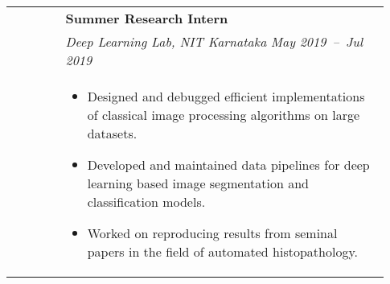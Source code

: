 \documentclass[letterpaper, 10pt, oneside]{article}
\newcommand{\bdit}[1]{{\textbf{#1}}}
\begin{document}
\begin{longtable}{@{} p{0.13\linewidth} p{0.8\linewidth}}
                         & \bdit{Summer Research Intern}                                                                                                                                                                        \\
                         & \textsl{Deep Learning Lab, NIT Karnataka} \hfill \hspace{-3em} \textsl{May 2019\ --\ Jul 2019}                                                                                                       \\
                         & \parbox{0.8\textwidth}{                                                                                                                                                                              %
        \begin{itemize}[leftmargin=*, itemsep=-0.88ex, topsep=-0.88ex]
            \item Designed and debugged efficient implementations of classical image processing algorithms on large datasets.
            \item Developed and maintained data pipelines for deep learning based image segmentation and classification models.
            \item Worked on reproducing results from seminal papers in the field of automated histopathology.
        \end{itemize}
    }
    \\
    \\


\end{longtable}
\end{document}
